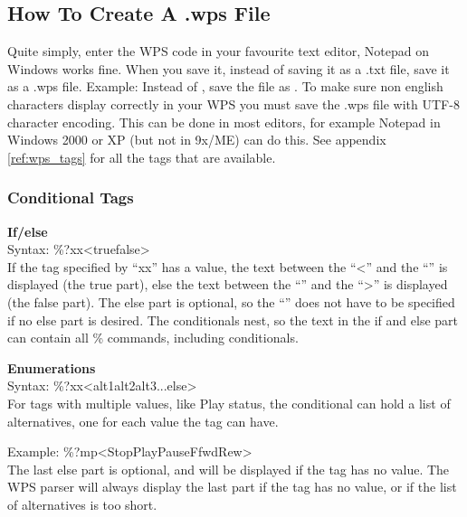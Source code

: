 \subsection{How To Create A .wps File}
Quite simply, enter the WPS code in your favourite text editor, Notepad on Windows works fine. When you save it, instead of saving it as a .txt file, save it as a .wps file. Example: Instead of , save the file as . To make sure non english characters display correctly in your WPS you must save the .wps file with UTF-8 character encoding. This can be done in most editors, for example Notepad in Windows 2000 or XP (but not in 9x/ME) can do this. See appendix \ref{ref:wps_tags} for all the tags that are available.

\subsubsection{Conditional Tags}

\textbf{If/else}\\

Syntax: \%?xx{\textless}true{\textbar}false{\textgreater}\\

If the tag specified by ``xx'' has a value, the text between the ``{\textless}'' and the ``{\textbar}'' is displayed (the true part), else the text between the ``{\textbar}'' and the ``{\textgreater}'' is displayed (the false part).
The else part is optional, so the ``{\textbar}'' does not have to be specified if no else part is desired. The conditionals nest, so the text in the if and else part can contain all \% commands, including conditionals.

\textbf{Enumerations}\\

Syntax: \%?xx{\textless}alt1{\textbar}alt2{\textbar}alt3{\textbar}...{\textbar}else{\textgreater}\\

For tags with multiple values, like Play status, the conditional can hold a list of alternatives, one for each value the tag can have.

Example: \%?mp{\textless}Stop{\textbar}Play{\textbar}Pause{\textbar}Ffwd{\textbar}Rew{\textgreater}\\

The last else part is optional, and will be displayed if the tag has no value. The WPS parser will always display the last part if the tag has no value, or if the list of alternatives is too short. 

